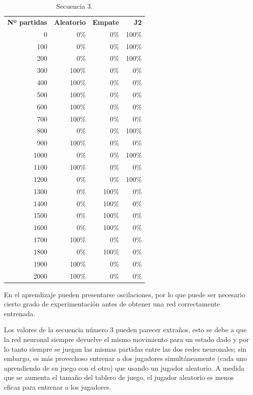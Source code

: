 \begin{table}[t]
\caption[Secuencia de entrenamiento 3]{Secuencia 3.}
\label{tab:secuencia3}
\centering
{\footnotesize
\begin{tabular}{rrrr}
\hline
\textbf{Nº partidas} & \textbf{Aleatorio} & \textbf{Empate} & \textbf{J2} \\
0	& 0\% &	0\% &	100\% \\
100	&0\% &	0\% &	100\% \\
200	&0\% &	0\% &	100\% \\
300	&100\% &	0\% &	0\% \\
400	&100\% &	0\% &	0\% \\
500	&100\% &	0\% &	0\% \\
600	&100\% &	0\% &	0\% \\
700	&100\% &	0\% &	0\% \\
800	&0\% &	0\% &	100\% \\
900	&100\% &	0\% &	0\% \\
1000 &	0\% &	0\% &	100\% \\
1100 &	100\% &	0\% &	0\% \\
1200 &	0\% &	0\% &	100\% \\
1300 &	0\% &	100\% &	0\% \\
1400 &	0\% &	100\% &	0\% \\
1500 &	0\% &	100\% &	0\% \\
1600 &	0\% &	100\% &	0\% \\
1700 &	100\% &	0\% &	0\% \\
1800 &	0\% &	100\% &	0\% \\
1900 &	100\% &	0\% &	0\% \\
2000 &	100\% &	0\% &	0\% \\
\hline
\end{tabular}
}
\end{table} 

En el aprendizaje pueden presentarse oscilaciones, por lo que puede ser necesario cierto grado de experimentación antes de obtener una red correctamente entrenada.

Los valores de la secuencia número 3 pueden parecer extraños, esto se debe a que la red neuronal siempre devuelve el mismo movimiento para un estado dado y por lo tanto siempre se juegan las mismas partidas entre las dos redes neuronales; sin embargo, es más provechoso entrenar a dos jugadores simultáneamente (cada uno aprendiendo de su juego con el otro) que usando un jugador aleatorio.
A medida que se aumenta el tamaño del tablero de juego, el jugador aleatorio es menos eficaz para entrenar a los jugadores.

